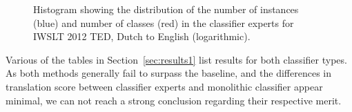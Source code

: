\begin{table}
\noindent{}
\caption{Number of classifier experts generated per data set. 
}
\label{tab:expertcount}
\end{table}


\begin{figure}
\begin{center}
\newlength\figureheight
\newlength\figurewidth
\setlength\figureheight{6cm}
\setlength\figurewidth{8cm}

\caption{Histogram showing the distribution of the number of instances (blue)
and number of classes (red) in the classifier experts for IWSLT 2012 TED,
Dutch to English (logarithmic).}
\label{fig:histogram}
\end{center}
\end{figure}

Various of the tables in Section~\ref{sec:results1} list results for both classifier
types. As both methods generally fail to surpass the baseline, and the
differences in translation score between classifier experts and monolithic
classifier appear minimal, we can not reach a strong conclusion regarding their
respective merit.



